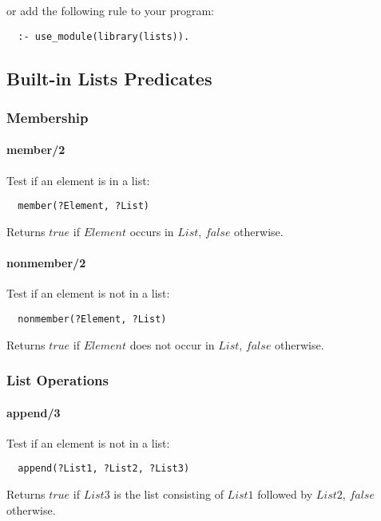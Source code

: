 \documentclass{article}
\begin{document}
\begin{multicols}{2}
  or add the following rule to your program:

  \begin{lstlisting}
  :- use_module(library(lists)).
  \end{lstlisting}
  
  \subsection{Built-in Lists Predicates}
  
  \subsubsection{Membership}
  
  \paragraph{member/2} Test if an element is in a list:
  
  \begin{lstlisting}
  member(?Element, ?List)
  \end{lstlisting} 
  
  Returns $true$ if $Element$ occurs in $List$, $false$ otherwise.

  \paragraph{nonmember/2} Test if an element is not in a list:
  
  \begin{lstlisting}
  nonmember(?Element, ?List)
  \end{lstlisting} 
  
 Returns $true$ if $Element$ does not occur in $List$, $false$ otherwise.
  
  \subsubsection{List Operations}

  \paragraph{append/3} Test if an element is not in a list:  
  
  \begin{lstlisting}
  append(?List1, ?List2, ?List3)
  \end{lstlisting} 
  
  Returns $true$ if $List3$ is the list consisting of $List1$ followed by $List2$, $false$ otherwise.
  

\end{multicols}
\end{document}
